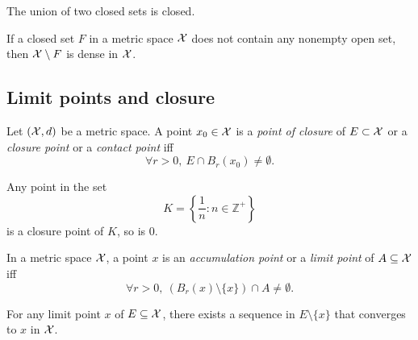 \begin{lem}
  \label{lem:unionClosedSets}
  The union of two closed sets is closed.
\end{lem}

\begin{exc}
  \label{exc:meagerSetComplementIsDense}
  If a closed set $F$ in a metric space ${\cal X}$
  does not contain any nonempty open set,
  then ${\cal X}\setminus F$ is dense in ${\cal X}$.
\end{exc}

\subsection{Limit points and closure}
\label{sec:limit-points-conv}

\begin{defn}
  \label{def:closurePointInMetricSpace}
  Let $({\cal X},d)$ be a metric space.
  A point $x_0\in {\cal X}$ is %
  a \emph{point of closure} of $E\subset {\cal X}$
  or a \emph{closure point} or a \emph{contact point}
  iff
  \begin{equation}
    \label{eq:closurePoint}
    \forall r>0, \ E\cap B_r(x_0) \ne \emptyset.
  \end{equation}
\end{defn}

\begin{exm}
  Any point in the set
   \begin{equation}
     \label{eq:K-Set}
     K=\left\{\frac{1}{n}: n\in \mathbb{Z}^+\right\}
   \end{equation}
   is a closure point of $K$,
   so is 0.
\end{exm}

\begin{defn}
  \label{def:limitPointMetricSpace}
  In a metric space ${\cal X}$, a point $x$ 
   is an \emph{accumulation point}
   or a \emph{limit point} of $A\subseteq {\cal X}$ iff
  \begin{equation}
    \label{eq:accumulationPointMetricSpace}
    \forall r>0,\ \left(B_r(x)\setminus\{x\}\right)\cap A
    \ne \emptyset. 
  \end{equation}
\end{defn}

\begin{lem}
  \label{lem:limitPointImpliesConvergence}
  For any limit point $x$ of $E\subseteq {\cal X}$,
  there exists a sequence in $E\setminus \{x\}$
  that converges to $x$ in ${\cal X}$.
\end{lem}

